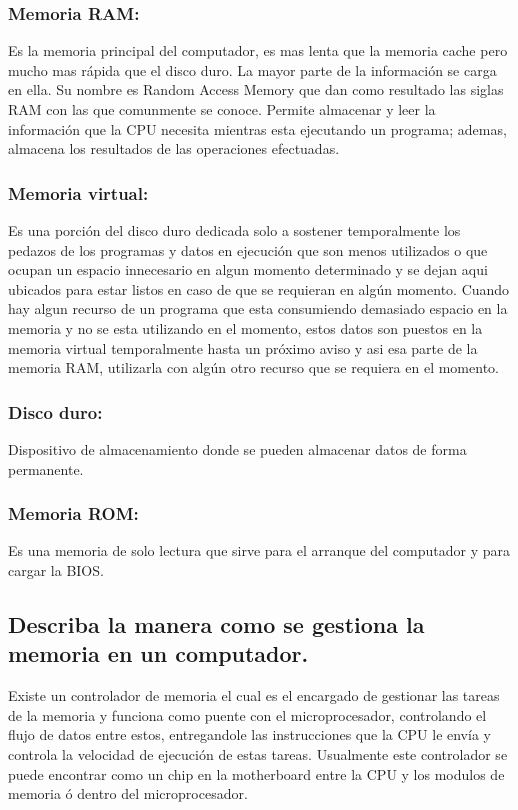\documentclass{article}
\begin{document}
\subsubsection{\textbf{Memoria RAM:}}
Es la memoria principal del computador, es mas lenta que la memoria cache pero mucho mas rápida que el disco duro. La mayor parte de la información se carga en ella. Su nombre es Random Access Memory que dan como resultado las siglas RAM con las que comunmente se conoce. \cite{augusto}
Permite almacenar y leer la información que la CPU necesita mientras esta ejecutando un programa; ademas, almacena los resultados de las operaciones efectuadas. \cite{ecured}
\subsubsection{\textbf{Memoria virtual:}}
Es una porción del disco duro dedicada solo a sostener temporalmente los pedazos de los programas y datos en ejecución que son menos utilizados o que ocupan un espacio innecesario en algun momento determinado y se dejan aqui ubicados para estar listos en caso de que se requieran en algún momento. Cuando hay algun recurso de un programa que esta consumiendo demasiado espacio en la memoria y no se esta utilizando en el momento, estos datos son puestos en la memoria virtual temporalmente hasta un próximo aviso y asi esa parte de la memoria RAM, utilizarla con algún otro recurso que se requiera en el momento.
\subsubsection{\textbf{Disco duro:}}
Dispositivo de almacenamiento donde se pueden almacenar datos de forma permanente. 
\subsubsection{\textbf{Memoria ROM:}}
Es una memoria de solo lectura que sirve para el arranque del computador y para cargar la BIOS.

    
\subsection{\textbf{Describa la manera como se gestiona la memoria en un computador.}}
Existe un controlador de memoria el cual es el encargado de gestionar las tareas de la memoria y funciona como puente con el microprocesador, controlando el flujo de datos entre estos, entregandole las instrucciones que la CPU le envía y controla la velocidad de ejecución de estas tareas. Usualmente este controlador se puede encontrar como un chip en la motherboard entre la CPU y los modulos de memoria ó dentro del microprocesador. \cite{augusto}
\end{document}
